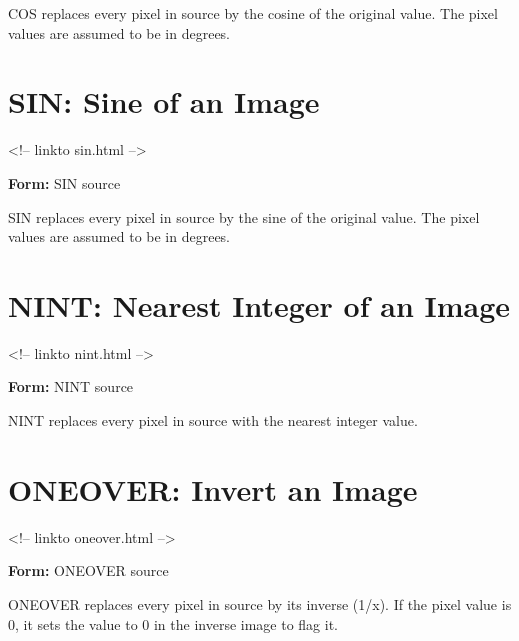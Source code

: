 COS replaces every pixel in source by the cosine of the original value. The
pixel values are assumed to be in degrees.

\section{SIN: Sine of an Image}
\begin{rawhtml}
<!-- linkto sin.html -->
\end{rawhtml}
\begin{command}
  \item[\textbf{Form:} SIN source\hfill]{}
\end{command}

SIN replaces every pixel in source by the sine of the original value. The
pixel values are assumed to be in degrees.

\section{NINT: Nearest Integer of an Image}
\begin{rawhtml}
<!-- linkto nint.html -->
\end{rawhtml}
\begin{command}
  \item[\textbf{Form:} NINT source\hfill]{}
\end{command}

NINT replaces every pixel in source with the nearest integer value.

\section{ONEOVER: Invert an Image}
\begin{rawhtml}
<!-- linkto oneover.html -->
\end{rawhtml}
\begin{command}
  \item[\textbf{Form:} ONEOVER source\hfill]{}
\end{command}

ONEOVER replaces every pixel in source by its inverse (1/x).  If the pixel
value is 0, it sets the value to 0 in the inverse image to flag it.

